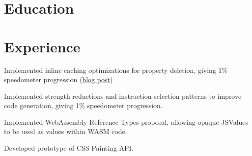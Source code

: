 \documentclass[12pt]{jmichaud-resume}
\begin{document}
\begin{minipage}[t]{0.29\textwidth}
\vspace{20pt}

\section{Education} 




\end{minipage}
\hfill
\begin{minipage}[t]{0.64\textwidth}
\section{Experience}
 \hfill {}

\vspace{10pt}
\begin{tightemize}
	\item Implemented inline caching optimizations for property deletion, giving 1\% speedometer progression (\href{https://webkit.org/blog/10298/inline-caching-delete/}{blog post})
	
\end{tightemize}
\hfill {}
\begin{tightemize}
	\item Implemented strength reductions and instruction selection patterns to improve code generation, giving 1\% speedometer progression.
	\item Implemented WebAssembly Reference Types proposal, allowing opaque JSValues to be used as values within WASM code.
	
\end{tightemize}
\sectionsep
{} \hfill {}

\begin{tightemize}
	\item Developed prototype of CSS Painting API.
\end{tightemize}
\sectionsep
{} \hfill {}



\end{minipage}
\end{document}
